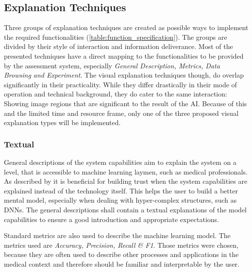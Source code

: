 \documentclass[11pt,a4paper,english]{scrreprt}
\begin{document}
\subsection{Explanation Techniques}\label{subsection:explanation_techniques}
Three groups of explanation techniques are created as possible ways to implement the required functionalities (\autoref{table:function_specification}). The groups are divided by their style of interaction and information deliverance. Most of the presented techniques have a direct mapping to the functionalities to be provided by the assessment system, especially \textit{General Description, Metrics, Data Browsing and Experiment}. The visual explanation techniques though, do overlap significantly in their practicality. While they differ drastically in their mode of operation and technical background, they do cater to the same interaction: Showing image regions that are significant to the result of the AI. Because of this and the limited time and resource frame, only one of the three proposed visual explanation types will be implemented.
\subsubsection*{Textual}
\begin{description}[font=\normalfont\itshape]
    \item[General Description:] General descriptions of the system capabilities aim to explain the system on a level, that is accessible to machine learning laymen, such as medical professionals. As described by \textcite{people_ai_google_website} it is beneficial for building trust when the system capabilities are explained instead of the technology itself. This helps the user to build a better mental model, especially when dealing with hyper-complex structures, such as DNNs. The general descriptions shall contain a textual explanations of the model capabilities to ensure a good introduction and appropriate expectations.
    \item[Metrics:] Standard metrics are also used to describe the machine learning model. The metrics used are \textit{Accuracy, Precision, Recall \& F1}. Those metrics were chosen, because they are often used to describe other processes and applications in the medical context and therefore should be familiar and interpretable by the user. 
\end{description}
\end{document}
